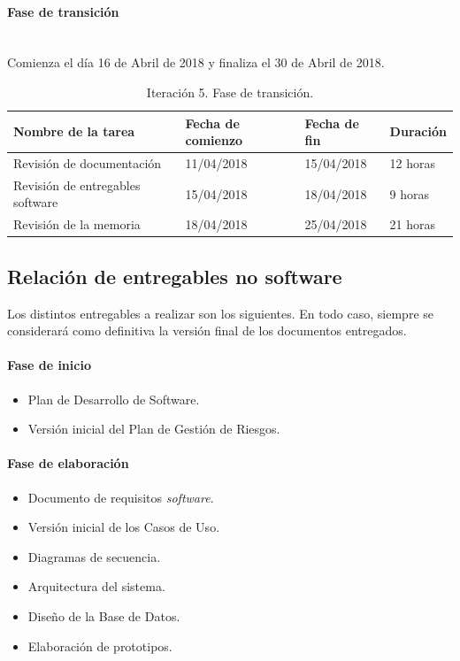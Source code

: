 \documentclass[twoside]{report}
\begin{document}
\paragraph{Fase de transición}\mbox{}\\

Comienza el día 16 de Abril de 2018 y finaliza el 30 de Abril de 2018.

\begin{table}[H]
\centering
\begin{tabular}{|l|l|l|l|}
\hline
Nombre de la tarea              & Fecha de comienzo & Fecha de fin & Duración \\ \hline
Revisión de documentación       & 11/04/2018        & 15/04/2018   & 12 horas   \\ \hline
Revisión de entregables software & 15/04/2018        & 18/04/2018   & 9 horas   \\ \hline
Revisión de la memoria & 18/04/2018        & 25/04/2018   & 21 horas   \\ \hline
\end{tabular}
\caption{Iteración 5. Fase de transición.}
\end{table}

\subsection{Relación de entregables no software}

Los distintos entregables a realizar son los siguientes. En todo caso, siempre se considerará como definitiva la versión final de los documentos entregados.
\paragraph{Fase de inicio\\}
\begin{itemize}
\item Plan de Desarrollo de Software.
\item Versión inicial del Plan de Gestión de Riesgos.
\end{itemize}
\paragraph{Fase de elaboración\\}
\begin{itemize}
\item Documento de requisitos \textit{software}.
\item Versión inicial de los Casos de Uso.
\item Diagramas de secuencia.
\item Arquitectura del sistema.
\item Diseño de la Base de Datos.
\item Elaboración de prototipos.
\end{itemize}
\end{document}
